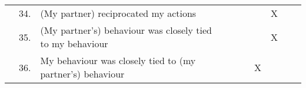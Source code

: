 \begin{table}[h]
\begin{tabular}{@{}lcl|ccccccc@{}}
                                     & 34.      & (My partner) reciprocated my actions                                       &                                                              &          &                                                              &         & X                                                         &       &                                                           \\
                                     & 35.      & (My partner's) behaviour was closely tied to my behaviour                  &                                                              &          &                                                              &         & X                                                         &       &                                                           \\
                                     & 36.      & My behaviour was closely tied to (my partner's) behaviour                  &                                                              &          &                                                              & X       &                                                           &       &                                                           \\ \bottomrule
\end{tabular}
\label{tab:evaluation}
\end{table}
\restoregeometry %